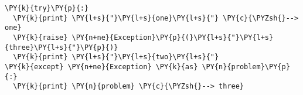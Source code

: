 \begin{Verbatim}[commandchars=\\\{\}]
\PY{k}{try}\PY{p}{:}
  \PY{k}{print} \PY{l+s}{"}\PY{l+s}{one}\PY{l+s}{"} \PY{c}{\PYZsh{}--> one}
  \PY{k}{raise} \PY{n+ne}{Exception}\PY{p}{(}\PY{l+s}{"}\PY{l+s}{three}\PY{l+s}{"}\PY{p}{)}
  \PY{k}{print} \PY{l+s}{"}\PY{l+s}{two}\PY{l+s}{"}
\PY{k}{except} \PY{n+ne}{Exception} \PY{k}{as} \PY{n}{problem}\PY{p}{:}
  \PY{k}{print} \PY{n}{problem} \PY{c}{\PYZsh{}--> three}
\end{Verbatim}
